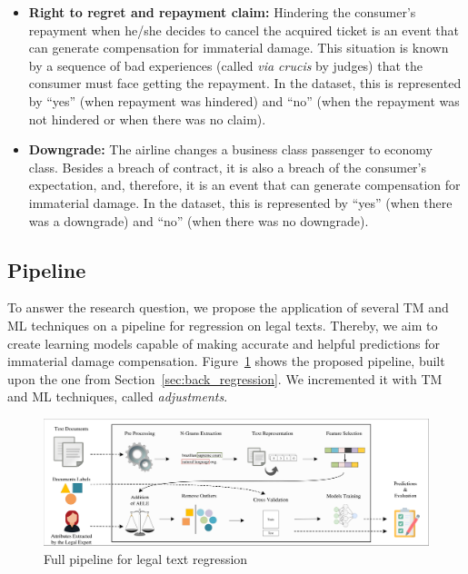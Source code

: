 \begin{itemize}[topsep=1em,leftmargin=1.5\parindent,align=left,labelwidth=0.5\parindent, noitemsep]
   \item \textbf{Right to regret and repayment claim:} Hindering the consumer's repayment when he/she decides to cancel the acquired ticket is an event that can generate compensation for immaterial damage. This situation is known by a sequence of bad experiences (called \textit{via crucis} by judges) that the consumer must face getting the repayment. In the dataset, this is represented by ``yes'' (when repayment was hindered) and ``no'' (when the repayment was not hindered or when there was no claim).
  \item \textbf{Downgrade:} The airline changes a business class passenger to economy class. Besides a breach of contract, it is also a breach of the consumer's expectation, and, therefore, it is an event that can generate compensation for immaterial damage. In the dataset, this is represented by ``yes'' (when there was a downgrade) and 
  ``no'' (when there was no downgrade).
\end{itemize}



\subsection{Pipeline}\label{sec:regression_pipeline}

To answer the research question, we propose the application of several TM and ML techniques on a pipeline for regression on legal texts.
Thereby, we aim to create learning models capable of making accurate and helpful predictions for immaterial damage compensation. Figure~\ref{fig:pipeline} shows the proposed pipeline, built upon the one from Section~\ref{sec:back_regression}. 
We incremented it with \gls{TM} and \gls{ML} techniques, called \textit{adjustments}.

\begin{figure}[htb]
  \caption{Full pipeline for legal text regression}
  \label{fig:pipeline}
  \includegraphics[width=\textwidth]{images/chapters/proposed_pipeline_v3.pdf}
\end{figure}


